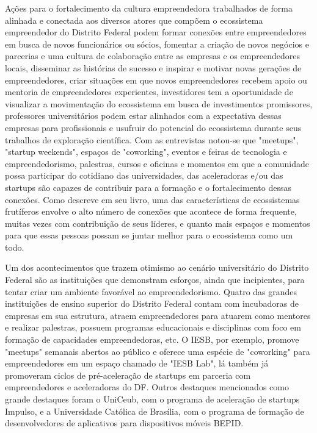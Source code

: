 Ações para o fortalecimento da cultura empreendedora trabalhados de forma alinhada e conectada aos diversos atores que compõem o ecossistema empreendedor do Distrito Federal podem formar conexões entre empreendedores em busca de novos funcionários ou sócios, fomentar a criação de novos negócios e parcerias e uma cultura de colaboração entre as empresas e os empreendedores locais, disseminar as histórias de sucesso e inspirar e motivar novas gerações de empreendedores, criar situações em que novos empreendedores recebem apoio ou mentoria de empreendedores experientes, investidores tem a oportunidade de visualizar a movimentação do ecossistema em busca de investimentos promissores, professores universitários podem estar alinhados com a expectativa dessas empresas para profissionais e usufruir do potencial do ecossistema durante seus trabalhos de exploração científica. Com as entrevistas notou-se que "meetups", "startup weekends", espaços de "coworking", eventos e feiras de tecnologia e empreendedorismo, palestras, cursos e oficinas e momentos em que a comunidade possa participar do cotidiano das universidades, das aceleradoras e/ou das startups são capazes de contribuir para a formação e o fortalecimento dessas conexões. Como  descreve em seu livro, uma das características de ecossistemas frutíferos envolve o alto número de conexões que acontece de forma frequente, muitas vezes com contribuição de seus líderes, e quanto mais espaços e momentos para que essas pessoas possam se juntar melhor para o ecossistema como um todo.

Um dos acontecimentos que trazem otimismo ao cenário universitário do Distrito Federal são as instituições que demonstram esforços, ainda que incipientes, para tentar criar um ambiente favorável ao empreendedorismo. Quatro das grandes instituições de ensino superior do Distrito Federal contam com incubadoras de empresas em sua estrutura, atraem empreendedores para atuarem como mentores e realizar palestras, possuem programas educacionais e disciplinas com foco em formação de capacidades empreendedoras, etc. O IESB, por exemplo, promove "meetups" semanais abertos ao público e oferece uma espécie de "coworking" para empreendedores em um espaço chamado de "IESB Lab", lá também já promoveram ciclos de pré-aceleração de startups em parceria com empreendedores e aceleradoras do DF. Outros destaques mencionados como grande destaques foram o UniCeub, com o programa de aceleração de startups Impulso, e a Universidade Católica de Brasília, com o programa de formação de desenvolvedores de aplicativos para dispositivos móveis BEPID.

